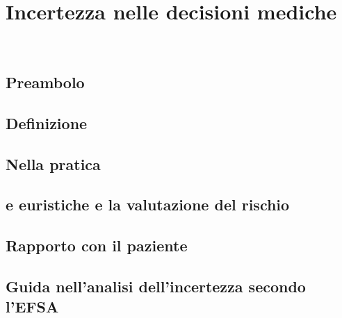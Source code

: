 \chapter{Incertezza nelle decisioni mediche}
\label{cap:incertezza-decisioni-mediche}

\\

\section{Preambolo}
\section{Definizione}
\section{Nella pratica}
\section{e euristiche e la valutazione del rischio}
\section{Rapporto con il paziente}
\section{Guida nell'analisi dell'incertezza secondo l'EFSA}
